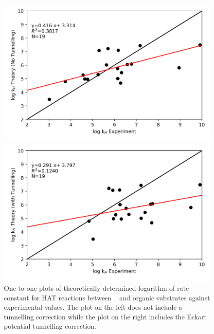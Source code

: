 \begin{figure}[htb]
\centering
\begin{minipage}{8cm}
  \centering
  \includegraphics[width=\textwidth]{figures/kH-theorya}
\end{minipage}%
\begin{minipage}{8cm}
  \centering
  \includegraphics[width=\textwidth]{figures/kH-theoryb}
\end{minipage}
\caption[One-to-one plots of theoretically determined logarithm of rate constant or HAT reactions between \cumo~ and organic substrates against experimental values.]{One-to-one plots of theoretically determined logarithm of rate constant for HAT reactions between \cumo~ and organic substrates against experimental values. The plot on the left does not include a tunnelling correction while the plot on the right includes the Eckart potential tunnelling correction.}
\label{fig:kH-theory}
\end{figure}

